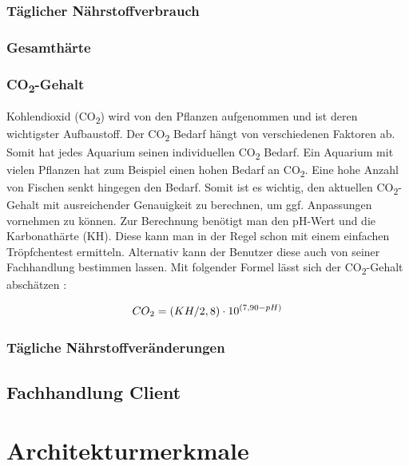 \subsubsection{Täglicher Nährstoffverbrauch}

\subsubsection{Gesamthärte}

\subsubsection{CO\textsubscript{2}-Gehalt}

Kohlendioxid (CO\textsubscript{2}) wird von den Pflanzen aufgenommen und ist deren wichtigster Aufbaustoff. Der CO\textsubscript{2} Bedarf hängt von verschiedenen Faktoren ab. Somit hat jedes Aquarium seinen individuellen CO\textsubscript{2} Bedarf. Ein Aquarium mit vielen Pflanzen hat zum Beispiel einen hohen Bedarf an CO\textsubscript{2}. Eine hohe Anzahl von Fischen senkt hingegen den Bedarf. Somit ist es wichtig, den aktuellen CO\textsubscript{2}-Gehalt mit ausreichender Genauigkeit zu berechnen, um ggf. Anpassungen vornehmen zu können. Zur Berechnung benötigt man den pH-Wert und die Karbonathärte (KH). Diese kann man in der Regel schon mit einem einfachen Tröpfchentest ermitteln. Alternativ kann der Benutzer diese auch von seiner Fachhandlung bestimmen lassen. Mit folgender Formel lässt sich der CO\textsubscript{2}-Gehalt abschätzen \autocite{Formel:CO2}:

\begin{equation}
CO\textsubscript{2} = (KH/2,8)\cdot10^{(7,90-pH)}
\end{equation}

\subsubsection{Tägliche Nährstoffveränderungen}

\subsection{Fachhandlung Client}

\section{Architekturmerkmale}